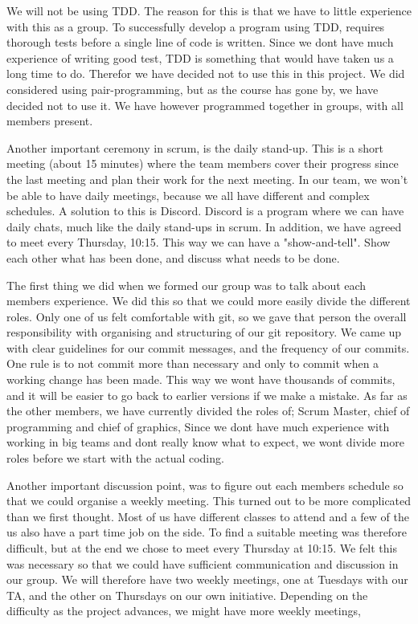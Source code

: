 \documentclass{article}
\begin{document}
We will not be using TDD. The reason for this is that we have to little experience with this as a group. To successfully develop a program using TDD, requires thorough tests before a single line of code is written. Since we dont have much experience of writing good test, TDD is something that would have taken us a long time to do. Therefor we have decided not to use this in this project. We did considered using pair-programming, but as the course has gone by, we have decided not to use it. We have however programmed together in groups, with all members present. 
\newline

Another important ceremony in scrum, is the daily stand-up. This is a short meeting (about 15 minutes) where the team members cover their progress since the last meeting and plan their work for the next meeting. In our team, we won't be able to have daily meetings, because we all have different and complex schedules. A solution to this is Discord. Discord is a program where we can have daily chats, much like the daily stand-ups in scrum. In addition, we have agreed to meet every Thursday, 10:15. This way we can have a "show-and-tell". Show each other what has been done, and discuss what needs to be done.
\newline

The first thing we did when we formed our group was to talk about each members experience. We did this so that we could more easily divide the different roles. Only one of us felt comfortable with git, so we gave that person the overall responsibility with organising and structuring of our git repository. We came up with clear guidelines for our commit messages, and the frequency of our commits. One rule is to not commit more than necessary and only to commit when a working change has been made. This way we wont have thousands of commits, and it will be easier to go back to earlier versions if we make a mistake. As far as the other members, we have currently divided the roles of; Scrum Master, chief of programming and chief of graphics, Since we dont have much experience with working in big teams and dont really know what to expect, we wont divide more roles before we start with the actual coding. \newline

Another important discussion point, was to figure out each members schedule so that we could organise a weekly meeting. This turned out to be more complicated than we first thought. Most of us have different classes to attend and a few of the us also have a part time job on the side. To find a suitable meeting was therefore  difficult, but at the end we chose to meet every Thursday at 10:15. We felt this was necessary so that we could have sufficient communication and discussion in our group. We will therefore have two weekly meetings, one at Tuesdays with our TA, and the other on Thursdays on our own initiative. Depending on the difficulty as the project advances, we might have more weekly meetings,  \newline
\end{document}
